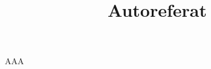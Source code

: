 \documentclass[12pt,a4paper]{amsart}
\title{Autoreferat}
\theoremstyle{definition}
\begin{document}
\maketitle

AAA
\end{document}
